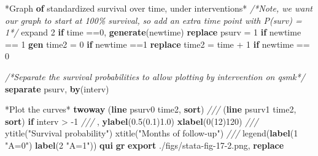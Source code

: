 \documentclass[
  10pt,
]{book}
\newenvironment{Shaded}{\begin{snugshade}}{\end{snugshade}}
\newcommand{\BaseNTok}[1]{\textcolor[rgb]{0.00,0.00,0.81}{#1}}
\newcommand{\CommentTok}[1]{\textcolor[rgb]{0.56,0.35,0.01}{\textit{#1}}}
\newcommand{\KeywordTok}[1]{\textcolor[rgb]{0.13,0.29,0.53}{\textbf{#1}}}
\newcommand{\NormalTok}[1]{#1}
\newcommand{\StringTok}[1]{\textcolor[rgb]{0.31,0.60,0.02}{#1}}
\begin{document}
\begin{Shaded}
\begin{Highlighting}[]
\NormalTok{*Graph }\KeywordTok{of}\NormalTok{ standardized survival }\BaseNTok{over}\NormalTok{ time, under interventions*}
\CommentTok{/*Note, we want our graph to start at 100\% survival, }
\CommentTok{so add an extra time point with P(surv) = 1*/}
\NormalTok{expand 2 }\KeywordTok{if}\NormalTok{ time ==0, }\KeywordTok{generate}\NormalTok{(newtime)}
\KeywordTok{replace}\NormalTok{ psurv  = 1 }\KeywordTok{if}\NormalTok{ newtime == 1}
\KeywordTok{gen}\NormalTok{ time2 = 0 }\KeywordTok{if}\NormalTok{ newtime ==1}
\KeywordTok{replace}\NormalTok{ time2 = time + 1 }\KeywordTok{if}\NormalTok{ newtime == 0}

\CommentTok{/*Separate the survival probabilities to allow plotting by }
\CommentTok{intervention on qsmk*/}
\KeywordTok{separate}\NormalTok{ psurv, }\KeywordTok{by}\NormalTok{(interv)}

\NormalTok{*Plot the curves*}
\KeywordTok{twoway}\NormalTok{ (}\KeywordTok{line}\NormalTok{ psurv0 time2, }\KeywordTok{sort}\NormalTok{) }\CommentTok{///}
\NormalTok{  (}\KeywordTok{line}\NormalTok{ psurv1 time2, }\KeywordTok{sort}\NormalTok{) }\KeywordTok{if}\NormalTok{ interv \textgreater{} {-}1 }\CommentTok{///}
\NormalTok{  , }\KeywordTok{ylabel}\NormalTok{(0.5(0.1)1.0) }\KeywordTok{xlabel}\NormalTok{(0(12)120) }\CommentTok{///}
  \BaseNTok{ytitle}\NormalTok{(}\StringTok{"Survival probability"}\NormalTok{) }\BaseNTok{xtitle}\NormalTok{(}\StringTok{"Months of follow{-}up"}\NormalTok{) }\CommentTok{///}
  \BaseNTok{legend}\NormalTok{(}\KeywordTok{label}\NormalTok{(1 }\StringTok{"A=0"}\NormalTok{) }\KeywordTok{label}\NormalTok{(2 }\StringTok{"A=1"}\NormalTok{))}
\KeywordTok{qui} \KeywordTok{gr} \KeywordTok{export}\NormalTok{ ./figs/stata{-}fig{-}17{-}2.png, }\KeywordTok{replace}
\end{Highlighting}
\end{Shaded}
\end{document}
